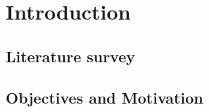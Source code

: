 \newpage
\section{Introduction}

\subsection{Literature survey}

\subsection{Objectives and Motivation}
%
%
%
